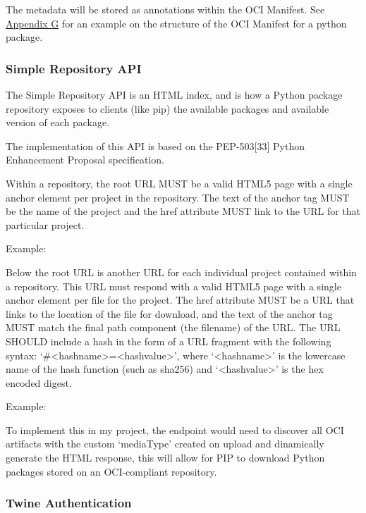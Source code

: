 \documentclass{article}
\begin{document}
  The metadata will be stored as annotations within the OCI Manifest. See \hyperref[sec:appendix-g]{Appendix G} for an example on the structure of the OCI Manifest for a python package.

  \subsubsection{Simple Repository API}

  The Simple Repository API is an HTML index, and is how a Python package repository exposes to clients (like pip) the available packages and available version of each package.

  The implementation of this API is based on the PEP-503[33] Python Enhancement Proposal specification.

  Within a repository, the root URL MUST be a valid HTML5 page with a single anchor element per project in the repository. The text of the anchor tag MUST be the name of the project and the href attribute MUST link to the URL for that particular project.

  Example:

  

  Below the root URL is another URL for each individual project contained within a repository. This URL must respond with a valid HTML5 page with a single anchor element per file for the project. The href attribute MUST be a URL that links to the location of the file for download, and the text of the anchor tag MUST match the final path component (the filename) of the URL. The URL SHOULD include a hash in the form of a URL fragment with the following syntax: `\#\textless{}hashname\textgreater{}=\textless{}hashvalue\textgreater', where `\textless{}hashname\textgreater' is the lowercase name of the hash function (such as sha256) and `\textless{}hashvalue\textgreater' is the hex encoded digest.

  Example:

  

  To implement this in my project, the endpoint would need to discover all OCI artifacts with the custom `mediaType' created on upload and dinamically generate the HTML response, this will allow for PIP to download Python packages stored on an OCI-compliant repository.

  \subsubsection{Twine Authentication}
\end{document}

